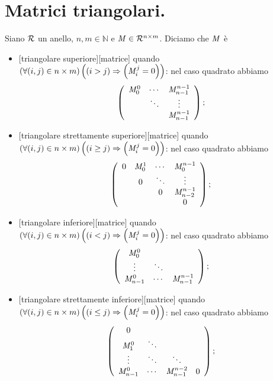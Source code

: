 \section{Matrici triangolari.}
\label{Matrici_MatriciTriangolari}
\begin{Definition}
	Siano $\mathcal{R}$ un anello, $n, m \in \mathbb{N}$ e $\mathit{M} \in \mathcal{R}^{n \times m}$.
  Diciamo che $\mathit{M}$ \`e
	\begin{itemize}
		\item {}[triangolare superiore][matrice] quando
      $\left ( \forall (i,j) \in n \times m \right ) \left ( \left ( i > j \right ) \Rightarrow \left ( \mathit{M}_i^j = 0 \right ) \right )$:
      nel caso quadrato abbiamo
\[
\left (
\begin{array}{ccc}
\mathit{M}_0^0 & \cdots & \mathit{M}_{n - 1}^{n - 1}\\
& \ddots & \vdots\\
& & \mathit{M}_{n - 1}^{n - 1}
\end{array}
\right );
\]
		\item {}[triangolare strettamente superiore][matrice] quando
      $\left ( \forall (i,j) \in n \times m \right ) \left ( \left ( i \geq j \right ) \Rightarrow \left ( \mathit{M}_i^j = 0 \right ) \right )$:
      nel caso quadrato abbiamo
\[
\left (
\begin{array}{cccc}
0 & \mathit{M}_0^1 & \cdots & \mathit{M}_0^{n - 1}\\
& 0 & \ddots & \vdots\\
& & 0 & \mathit{M}_{n - 2}^{n - 1}\\
& & & 0
\end{array}
\right );
\]
		\item {}[triangolare inferiore][matrice] quando
      $\left ( \forall (i,j) \in n \times m \right ) \left ( \left ( i < j \right ) \Rightarrow \left ( \mathit{M}_i^j = 0 \right ) \right )$:
      nel caso quadrato abbiamo
\[
\left (
\begin{array}{ccc}
\mathit{M}_0^0 & &\\
\vdots & \ddots &\\
\mathit{M}_{n - 1}^0 & \cdots & \mathit{M}_{n - 1}^{n - 1}\\
\end{array}
\right );
\]
		\item {}[triangolare strettamente inferiore][matrice] quando
    $\left ( \forall (i,j) \in n \times m \right ) \left ( \left ( i \leq j \right ) \Rightarrow \left ( \mathit{M}_i^j = 0 \right ) \right )$:
      nel caso quadrato abbiamo
\[
\left (
\begin{array}{cccc}
0 & & &\\
\mathit{M}_1^0 & \ddots & &\\
\vdots & \ddots & \ddots &\\
\mathit{M}_{n - 1}^0 & \cdots & \mathit{M}_{n - 1}^{n - 2} & 0\\
\end{array}
\right );
\]
	\end{itemize}
\end{Definition}
